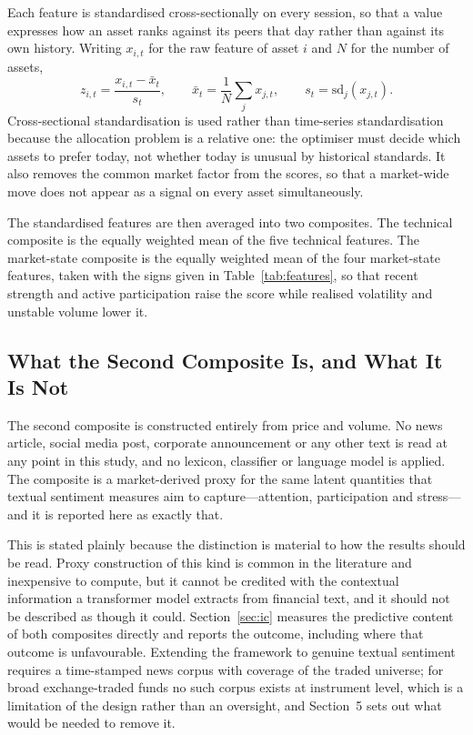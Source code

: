 \documentclass{singlecol-new}
\theoremstyle{TH}{
\newtheorem{lemma}{Lemma}
\newtheorem{theorem}[lemma]{Theorem}
\newtheorem{corrolary}[lemma]{Corrolary}
\newtheorem{conjecture}[lemma]{Conjecture}
\newtheorem{proposition}[lemma]{Proposition}
\newtheorem{claim}[lemma]{Claim}
\newtheorem{stheorem}[lemma]{Wrong Theorem}
\newtheorem{algorithm}{Algorithm}
}
\theoremstyle{THrm}{
\newtheorem{definition}{Definition}[section]
\newtheorem{question}{Question}[section]
\newtheorem{remark}{Remark}
\newtheorem{scheme}{Scheme}
}
\theoremstyle{THhit}{
\newtheorem{case}{Case}[section]
}
\begin{document}
Each feature is standardised cross-sectionally on every session, so that a value
expresses how an asset ranks against its peers that day rather than against its own
history. Writing $x_{i,t}$ for the raw feature of asset $i$ and $N$ for the number of
assets,
\begin{equation}
z_{i,t} = \frac{x_{i,t} - \bar{x}_t}{s_t}, \qquad
\bar{x}_t = \frac{1}{N}\sum_{j} x_{j,t}, \qquad
s_t = \mathrm{sd}_j(x_{j,t}).
\end{equation}
Cross-sectional standardisation is used rather than time-series standardisation because
the allocation problem is a relative one: the optimiser must decide which assets to
prefer today, not whether today is unusual by historical standards. It also removes the
common market factor from the scores, so that a market-wide move does not appear as a
signal on every asset simultaneously.

The standardised features are then averaged into two composites. The technical
composite is the equally weighted mean of the five technical features. The market-state
composite is the equally weighted mean of the four market-state features, taken with
the signs given in Table~\ref{tab:features}, so that recent strength and active participation raise the
score while realised volatility and unstable volume lower it.

\subsection{What the Second Composite Is, and What It Is Not}
\label{sec:notsentiment}

The second composite is constructed entirely from price and volume. No news article,
social media post, corporate announcement or any other text is read at any point in
this study, and no lexicon, classifier or language model is applied. The composite is a
market-derived proxy for the same latent quantities that textual sentiment measures aim
to capture---attention, participation and stress---and it is reported here as exactly
that.

This is stated plainly because the distinction is material to how the results should be
read. Proxy construction of this kind is common in the literature and inexpensive to
compute, but it cannot be credited with the contextual information a transformer model
extracts from financial text, and it should not be described as though it could.
Section~\ref{sec:ic} measures the predictive content of both composites directly and
reports the outcome, including where that outcome is unfavourable. Extending the
framework to genuine textual sentiment requires a time-stamped news corpus with
coverage of the traded universe; for broad exchange-traded funds no such corpus exists
at instrument level, which is a limitation of the design rather than an oversight, and
Section~5 sets out what would be needed to remove it.
\end{document}
